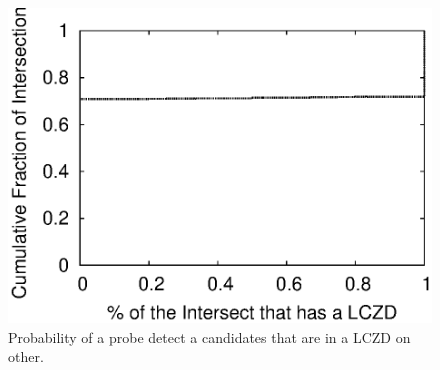 

\begin{figure}
\begin{center}
\includegraphics[width=0.8\columnwidth]{figs/patching/overlapcoverage/overlapcoverage.eps}
\caption{Probability of a probe detect a candidates that are in a LCZD on other.}
\label{fig:lczd.intersection}
\end{center}
%
\end{figure}
